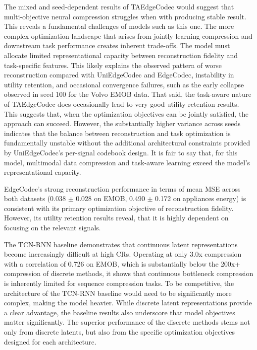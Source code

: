 The mixed and seed-dependent results of TAEdgeCodec would suggest that multi-objective neural compression struggles when with producing stable result. This reveals a fundamental challenges of models such as this one. The more complex optimization landscape that arises from jointly learning compression and downstream task performance creates inherent trade-offs. The model must allocate limited representational capacity between reconstruction fidelity and task-specific features. This likely explains the observed pattern of worse reconstruction compared with UniEdgeCodec and EdgeCodec, instability in utility retention, and occasional convergence failures, such as the early collapse observed in seed 100 for the Volvo EMOB data. That said, the task-aware nature of TAEdgeCodec does occasionally lead to very good utility retention results. This suggests that, when the optimization objectives can be jointly satisfied, the approach can succeed. However, the substantially higher variance across seeds indicates that the balance between reconstruction and task optimization is fundamentally unstable without the additional architectural constraints provided by UniEdgeCodec's per-signal codebook design. It is fair to say that, for this model, multimodal data compression and task-aware learning exceed the model's representational capacity.

EdgeCodec's strong reconstruction performance in terms of mean MSE across both datasets (0.038 $\pm$ 0.028 on EMOB, 0.490 $\pm$ 0.172 on appliances energy) is consistent with its primary optimization objective of reconstruction fidelity. However, its utility retention results reveal, that it is highly dependent on focusing on the relevant signals.

The TCN-RNN baseline demonstrates that continuous latent representations become increasingly difficult at high CRs. Operating at only 3.0x compression with a correlation of 0.726 on EMOB, which is substantially below the 200x+ compression of discrete methods, it shows that continuous bottleneck compression is inherently limited for sequence compression tasks. To be competitive, the architecture of the TCN-RNN baseline would need to be significantly more complex, making the model heavier. While discrete latent representations provide a clear advantage, the baseline results also underscore that model objectives matter significantly. The superior performance of the discrete methods stems not only from discrete latents, but also from the specific optimization objectives designed for each architecture.

